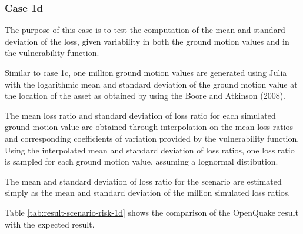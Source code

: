\subsubsection{Case 1d}

The purpose of this case is to test the computation of the mean and standard deviation of the loss, given variability in both the ground motion values and in the vulnerability function.

Similar to case 1c, one million ground motion values are generated using Julia with the logarithmic mean and standard deviation of the ground motion value at the location of the asset as obtained by using the Boore and Atkinson (2008).

The mean loss ratio and standard deviation of loss ratio for each simulated ground motion value are obtained through interpolation on the mean loss ratios and corresponding coefficients of variation provided by the vulnerability function. Using the interpolated mean and standard deviation of loss ratios, one loss ratio is sampled for each ground motion value, assuming a lognormal distibution.

The mean and standard deviation of loss ratio for the scenario are estimated simply as the mean and standard deviation of the million simulated loss ratios.



Table \ref{tab:result-scenario-risk-1d} shows the comparison of the OpenQuake result with the expected result.